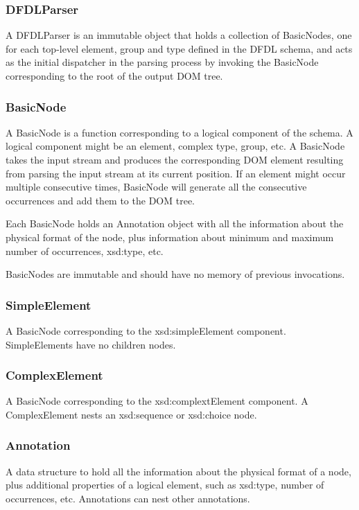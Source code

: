 \documentclass[a4paper,10pt]{article}
\begin{document}
\subsubsection{DFDLParser}

A DFDLParser is an immutable object that holds a collection of BasicNodes, one for each top-level element, group  and type defined in the DFDL schema, and acts as the initial dispatcher in the parsing process by invoking the BasicNode corresponding to the root of the output DOM tree.

\subsubsection{BasicNode}

A BasicNode is a function corresponding to a logical component of the schema. A logical component might be an element, complex type, group, etc. A BasicNode takes the input stream and produces the corresponding DOM element resulting from parsing the input stream at its current position. If an element might occur multiple consecutive times, BasicNode will generate all the consecutive occurrences and add them to the DOM tree.

Each BasicNode holds an Annotation object with all the information about the physical format of the node, plus information about minimum and maximum number of occurrences, xsd:type, etc.

BasicNodes are immutable and should have no memory of previous invocations.

\subsubsection{SimpleElement}

A BasicNode corresponding to the xsd:simpleElement component. SimpleElements have no children nodes.

\subsubsection{ComplexElement}

A BasicNode corresponding to the xsd:complextElement component. A ComplexElement nests an xsd:sequence or xsd:choice node.

\subsubsection{Annotation}

A data structure to hold all the information about the physical format of a node, plus additional properties of a logical element, such as xsd:type, number of occurrences, etc. Annotations can nest other annotations.
\end{document}

